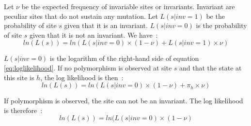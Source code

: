 \documentclass[a4paper,11pt]{article}
\begin{document}
Let $\nu$ be the expected frequency of invariable sites or invariants. 
Invariant are peculiar sites that do not sustain any mutation. Let
$L(s|inv=1)$ be the probability of site $s$ given that it is 
an invariant. $L(s|inv=0)$ is the probability of site $s$ given that
it is not an invariant. We have~:
\begin{equation}\label{eq:loglikelihood}
\nonumber ln(L(s)) = ln(L(s|inv=0)\times(1 - \nu) + L(s|inv=1)\times \nu)
\end{equation}

$L(s|inv=0)$ is the logarithm of the right-hand side of equation \ref{eq:loglikelihood}. If no polymorphism is observed at site $s$ and that the state at this site is $h$, the log likelihood is then~: 
\begin{equation}\label{eq:invariant1}
ln(L(s)) = ln(L(s|inv=0)\times(1 - \nu) + \pi_h \times \nu)
\end{equation}

If polymorphism is observed, the site can not be an invariant. The log likelihood is therefore~: 
\begin{equation}\label{eq:invariant2}
ln(L(s)) = ln(L(s|inv=0)\times(1 - \nu)
\end{equation}
\end{document}
